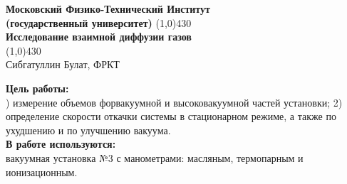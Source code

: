 \documentclass[11pt]{article}
\begin{document}
\begin{titlepage}

\begin{center}
\large\textbf{Московский Физико-Технический Институт}\\
\large\textbf{(государственный университет)}
\vfill
\line(1,0){430}\\[1mm]
\huge\textbf{Исследование взаимной диффузии газов}\\
\line(1,0){430}\\[1mm]
\vfill
\large Сибгатуллин Булат, ФРКТ\\
\end{center}

\end{titlepage}
\noindent \textbf{Цель работы:} \\
) измерение объемов форвакуумной и высоковакуумной частей установки; 2) определение скорости откачки системы в стационарном режиме, а также по ухудшению и по улучшению вакуума.\\
\noindent \textbf{В работе используются:} \\
\indent вакуумная установка №3 с манометрами: масляным,  термопарным  и ионизационным.
\end{document}
